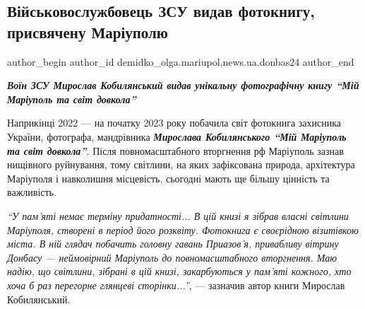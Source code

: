  
 
 
 
 
 
\subsection{Військовослужбовець ЗСУ видав фотокнигу, присвячену Маріуполю}
\label{sec:11_01_2023.stz.news.ua.donbas24.1.fotokniga_mrpl}
 
\ifcmt
 author_begin
   author_id demidko_olga.mariupol,news.ua.donbas24
 author_end
\fi


\begin{center}
  \em\color{blue}\bfseries\Large
  Воїн ЗСУ Мирослав Кобилянський видав унікальну фотографічну книгу \enquote{Мій Маріуполь та світ довкола}
\end{center}

Наприкінці 2022 — на початку 2023 року побачила світ фотокнига захисника
України, фотографа, мандрівника \emph{\textbf{Мирослава Кобилянського \enquote{Мій Маріуполь та світ
довкола}}}. Після повномасштабного вторгнення рф Маріуполь зазнав нищівного
руйнування, тому світлини, на яких зафіксована природа, архітектура Маріуполя і
навколишня місцевість, сьогодні мають ще більшу цінність та важливість.

\begin{leftbar}
\emph{\enquote{У пам'яті немає терміну придатності... В цій книзі я зібрав власні світлини
Маріуполя, створені в період його розквіту. Фотокнига є своєрідною
візитівкою міста. В ній глядач побачить головну гавань Приазов'я,
привабливу вітрину Донбасу — неймовірний Маріуполь до повномасштабного
вторгнення. Маю надію, що світлини, зібрані в цій книзі, закарбуються у
пам'яті кожного, хто хоча б раз перегорне глянцеві сторінки...}}, —
зазначив автор книги Мирослав Кобилянський.
\end{leftbar}

